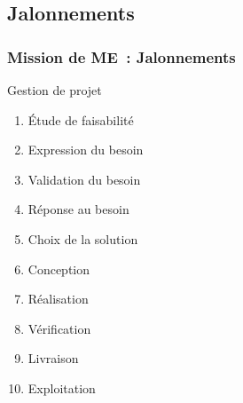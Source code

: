 \subsection{Jalonnements}

\begin{frame}
	\frametitle{Mission de ME~: Jalonnements}
\end{frame}

\begin{frame}
	\centering
	\begin{block}{Gestion de projet}
		\begin{enumerate}
			\item Étude de faisabilité
			\item Expression du besoin
			\item Validation du besoin
			\item Réponse au besoin
			\item Choix de la solution
			\item Conception
			\item Réalisation
			\item Vérification
			\item Livraison
			\item Exploitation
		\end{enumerate}
	\end{block}
\end{frame}
